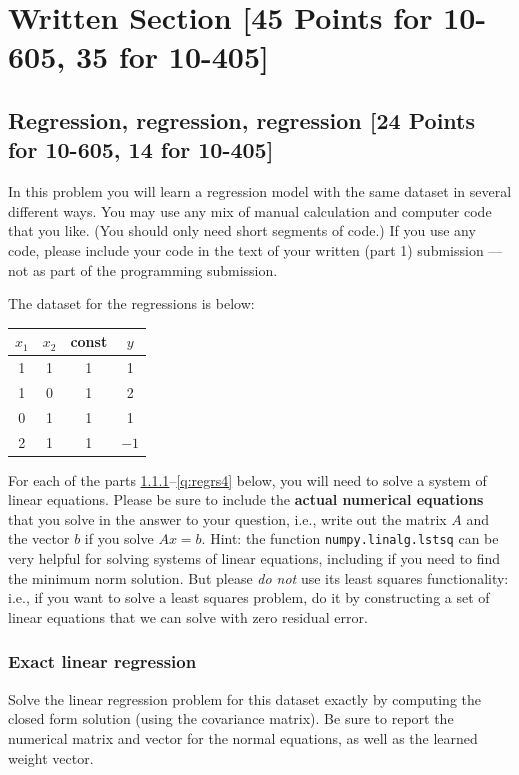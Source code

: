 \section{Written Section [45 Points for 10-605, 35 for 10-405]}

\subsection{Regression, regression, regression [24 Points for 10-605, 14 for 10-405]}

In this problem you will learn a regression model with the same dataset in several different ways. You may use any mix of manual calculation and computer code that you like. (You should only need short segments of code.) If you use any code, please include your code in the text of your written (part 1) submission --- not as part of the programming submission.

The dataset for the regressions is below:

\begin{center}
\begin{tabular}{c|c|c|c}
    $x_1$ & $x_2$ & const & $y$ \\
    \hline
    1 & 1 & 1 & 1 \\
    1 & 0 & 1 & 2\\
    0 & 1 & 1 & 1 \\
    2 & 1 & 1 & $-1$
\end{tabular}
\end{center}

For each of the parts \ref{q:regrs1}--\ref{q:regrs4} below, you will need to solve a system of linear equations. Please be sure to include the \textbf{actual numerical equations} that you solve in the answer to your question, i.e., write out the matrix $A$ and the vector $b$ if you solve $Ax=b$. Hint: the function \texttt{numpy.linalg.lstsq} can be very helpful for solving systems of linear equations, including if you need to find the minimum norm solution. But please \emph{do not} use its least squares functionality: i.e., if you want to solve a least squares problem, do it by constructing a set of linear equations that we can solve with zero residual error.


\subsubsection{Exact linear regression }
\label{q:regrs1}

Solve the linear regression problem for this dataset exactly by computing the closed form solution (using the covariance matrix). Be sure to report the numerical matrix and vector for the normal equations, as well as the learned weight vector.

